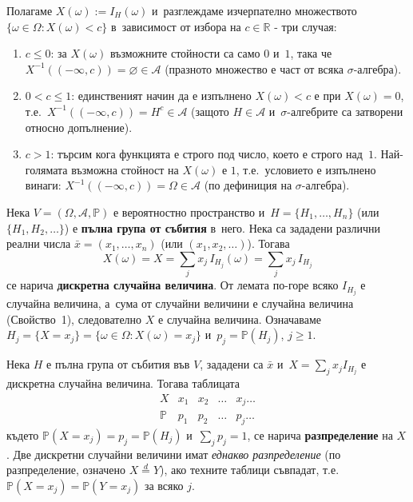 \begin{proofbox}
Полагаме $X(\omega):=I_H(\omega)$ и~разглеждаме изчерпателно
множеството $\{\omega\in\Omega : X(\omega)<c\}$ в~зависимост от
избора на $c\in\mathbb R$ - три случая:
\begin{enumerate}[label=\arabic*)]
  \item $c\le 0$: за $X(\omega)$ възможните стойности са само $0$ и~$1$, така че $X^{-1}((-\infty,c)) = \varnothing \in\mathcal A$ (празното множество е част от всяка $\sigma$-алгебра).
  \item $0<c\le 1$: единственият начин да е изпълнено $X(\omega)<c$ е при $X(\omega)=0$, т.е.\ $X^{-1}((-\infty,c)) = H^c \in\mathcal A$ (защото $H\in\mathcal A$ и~$\sigma$-алгебрите са затворени относно допълнение).
  \item $c>1$: търсим кога функцията е строго под число, което е строго над~$1$. Най-голямата възможна стойност на $X(\omega)$ е $1$, т.е.\ условието е изпълнено винаги: $X^{-1}((-\infty,c)) = \Omega \in\mathcal A$ (по дефиниция на $\sigma$-алгебра). \qedbg
\end{enumerate}
\end{proofbox}

\begin{defbox}
Нека $V=(\Omega,\mathcal A,\mathbb P)$ е вероятностно пространство и~$H=\{H_1,\dots,H_n\}$ (или $\{H_1,H_2,\dots\}$) е \textbf{пълна група
от събития} в~него. Нека са зададени различни реални числа $\bar x =
(x_1,\dots,x_n)$ (или $(x_1,x_2,\dots)$). Тогава
\[
  X(\omega) = X = \sum_j x_j\,I_{H_j}(\omega) = \sum_j x_j\,I_{H_j}
\]
се нарича \textbf{дискретна случайна величина}. От лемата по-горе
всяко $I_{H_j}$ е случайна величина, а~сума от случайни
величини е случайна величина (Свойство~1), следователно $X$ е
случайна величина. Означаваме $H_j=\{X=x_j\}=\{\omega\in\Omega:
X(\omega)=x_j\}$ и~$p_j = \mathbb P(H_j)$, $j\ge 1$.
\end{defbox}

\begin{defbox}
Нека $H$ е пълна група от събития във $V$, зададени са $\bar x$ и~$X=\sum_j x_jI_{H_j}$ е дискретна случайна величина. Тогава
таблицата
\[
  \begin{array}{c|cccc}
    X & x_1 & x_2 & \dots & x_j \dots\\\hline
    \mathbb P & p_1 & p_2 & \dots & p_j \dots
  \end{array}
\]
където $\mathbb P(X=x_j)=p_j=\mathbb P(H_j)$ и~$\sum_j p_j=1$, се
нарича \textbf{разпределение} на $X$. Две дискретни случайни
величини имат \emph{еднакво разпределение} (по разпределение,
означено $X\stackrel{d}{=}Y$), ако техните таблици съвпадат, т.е.\
$\mathbb P(X=x_j)=\mathbb P(Y=x_j)$ за всяко $j$.
\end{defbox}

